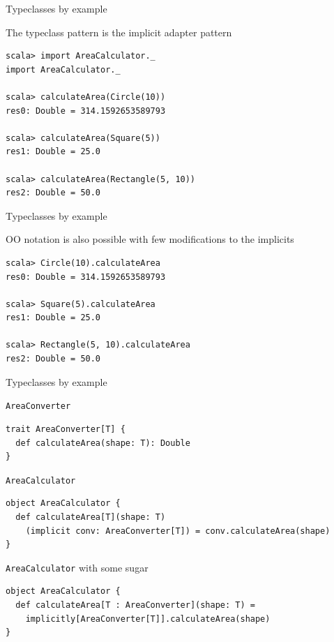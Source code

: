 \begin{frame}[fragile]{Typeclasses by example}
\begin{exampleblock}{The typeclass pattern is the implicit adapter pattern}
\begin{lstlisting}
scala> import AreaCalculator._
import AreaCalculator._

scala> calculateArea(Circle(10))
res0: Double = 314.1592653589793

scala> calculateArea(Square(5))
res1: Double = 25.0

scala> calculateArea(Rectangle(5, 10))
res2: Double = 50.0
\end{lstlisting}
\end{exampleblock}
\end{frame}

\begin{frame}[fragile]{Typeclasses by example}
\begin{exampleblock}{OO notation is also possible with few modifications to the implicits}
\begin{lstlisting}
scala> Circle(10).calculateArea
res0: Double = 314.1592653589793

scala> Square(5).calculateArea
res1: Double = 25.0

scala> Rectangle(5, 10).calculateArea
res2: Double = 50.0
\end{lstlisting}
\end{exampleblock}
\end{frame}

\begin{frame}[fragile]{Typeclasses by example}
\begin{exampleblock}{\lstinline!AreaConverter!}
\begin{lstlisting}
trait AreaConverter[T] {
  def calculateArea(shape: T): Double
}
\end{lstlisting}
\end{exampleblock}
\begin{exampleblock}{\lstinline!AreaCalculator!}
\begin{lstlisting}
object AreaCalculator {
  def calculateArea[T](shape: T)
    (implicit conv: AreaConverter[T]) = conv.calculateArea(shape)
}
\end{lstlisting}
\end{exampleblock}
\begin{exampleblock}{\lstinline!AreaCalculator! with some sugar}
\begin{lstlisting}
object AreaCalculator {
  def calculateArea[T : AreaConverter](shape: T) =
    implicitly[AreaConverter[T]].calculateArea(shape)
}
\end{lstlisting}
\end{exampleblock}
\end{frame}

